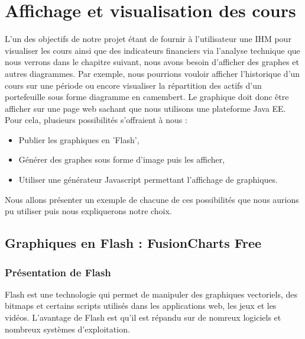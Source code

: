 \section{Affichage et visualisation des cours}

L'un des objectifs de notre projet étant de fournir à l'utilisateur une IHM pour visualiser les cours ainsi que des indicateurs financiers via l'analyse technique que nous verrons dans le chapitre suivant, nous avons besoin d'afficher des graphes et autres diagrammes.
Par exemple, nous pourrions vouloir afficher l'historique d'un cours sur une période ou encore visualiser la répartition des actifs d'un portefeuille sous forme diagramme en camembert. Le graphique doit donc être afficher sur une page web sachant que nous utilisons une plateforme Java EE.\\

Pour cela, plusieurs possibilités s'offraient à nous :
\begin{itemize}
 \item Publier les graphiques en 'Flash',
 \item Générer des graphes sous forme d'image puis les afficher,
 \item Utiliser une générateur Javascript permettant l'affichage de graphiques.
\end{itemize}

Nous allons présenter un exemple de chacune de ces possibilités que nous aurions pu utiliser puis nous expliquerons notre choix.

\subsection{Graphiques en Flash : FusionCharts Free}

\subsubsection{Présentation de Flash}
Flash est une technologie qui permet de manipuler des graphiques vectoriels, des bitmaps et certains scripts utilisés dans les applications web, les jeux et les vidéos. L'avantage de Flash est qu'il est répandu sur de nomreux logiciels et nombreux systèmes d'exploitation.\\

